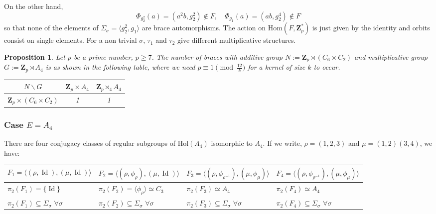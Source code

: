 \documentclass[12pt]{article}
\newtheorem{proposition}[theorem]{Proposition}
\theoremstyle{definition}
\newcommand{\Z}{\mathbf Z}
\newcommand{\Hol}{\mathrm{Hol}}
\newcommand{\Hom}{\mathrm{Hom}}
\newcommand{\Id}{\operatorname{Id}}
\begin{document}
On the other hand,
$$
\Phi_{g_2^2}(a)=(a^2b, g_2^2)\not\in F,\quad \Phi_{g_1}(a)=(ab,g_2^4)\not\in F
$$
so that none of the elements of $\Sigma_{\sigma}=\langle g_2^2, g_1\rangle$ are brace automorphisms.
The action on $\Hom(F,\Z_p^*)$ is just given by the identity and orbits consist on single elements. For a non trivial $\sigma$, $\tau_1$ and $\tau_2$ give different multiplicative structures.


\begin{proposition}
	Let $p$ be a prime number, $p\geq 7$.
	The number of braces with additive group $N:=\Z_p \rtimes (C_6\times C_2)$ and multiplicative group $G:=\Z_p\rtimes A_4$ is as shown in the following table, where we need $p\equiv 1 \pmod{\frac {12}k}$ for a kernel of size $k$ to occur.
	
	\begin{center}
		\begin{tabular}{|c||c|c|}
			\hline
			$N \backslash G$ & $\Z_p\times A_4$ & $\Z_p\rtimes_{4} A_4 $ \\
			\hline
			\hline
			$\Z_p\times (C_6\times C_2)$ & 1&1 \\
			\hline
		\end{tabular}
	\end{center}
\end{proposition}

\subsubsection*{Case $E=A_4$}

There are four  conjugacy classes of regular subgroups of $\Hol(A_4)$ isomorphic to $A_4$. If we write, $\rho=(1,2,3)$ and $\mu=(1,2)(3,4)$, we have:
\begin{center}
    \begin{tabular}{|l|l|l|l|}
    
    \hline
       $F_1=\langle (\rho,\Id),(\mu,\Id)\rangle$ &
     $ F_2=\langle(\rho,\phi_{\rho}),(\mu,\Id)\rangle$&
      $F_3=\langle(\rho,\phi_{\rho^{-1}}),(\mu,\phi_{\mu})\rangle$&
      $F_4=\langle(\rho,\phi_{\rho^{-1}}),(\mu,\phi_{\mu}) \rangle$\\
      \hline
      $\pi_2(F_1)=\{\Id\}$&
      $\pi_2(F_2)=\langle \phi_{\rho}\rangle\simeq C_3$ &
      $\pi_2(F_3)\simeq A_4$&
      $\pi_2(F_4)\simeq A_4$\\
      $\pi_2(F_1)\subseteq \Sigma_{\sigma}$ $\forall \sigma$ & 
      $\pi_2(F_2)\subseteq \Sigma_{\sigma}$ $\forall \sigma$ &
      $\pi_2(F_3)\subseteq \Sigma_{\sigma}$ $\forall \sigma$ &
      $\pi_2(F_4)\subseteq \Sigma_{\sigma}$ $\forall \sigma$
       \\
      \hline
    \end{tabular}
\end{center}    
\end{document}
